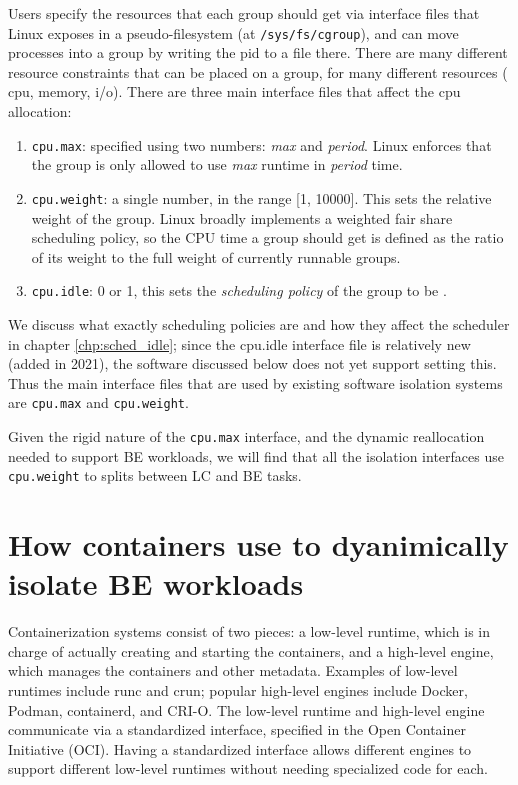 Users specify the resources that each group should get via interface files that
Linux exposes in a pseudo-filesystem (at \texttt{/sys/fs/cgroup}), and can move
processes into a group by writing the pid to a file there. There are many
different resource constraints that can be placed on a group, for many different
resources (\eg{} cpu, memory, i/o). There are three main interface files that
affect the cpu allocation:
\begin{enumerate}
    \item \texttt{cpu.max}: specified using two numbers: \textit{max} and \textit{period}. Linux
    enforces that the group is only allowed to use \textit{max} runtime in \textit{period} time.
    \item \texttt{cpu.weight}: a single number, in the range [1, 10000]. This
    sets the relative weight of the group. Linux broadly implements a weighted fair
    share scheduling policy, so the CPU time a group should get is defined as
    the ratio of its weight to the full weight of currently runnable groups.
    \item \texttt{cpu.idle}: 0 or 1, this sets the \textit{scheduling policy} of
    the group to be \schedidle{}.
\end{enumerate}

We discuss what exactly scheduling policies are and how they affect the
scheduler in chapter \ref{chp:sched_idle}; since the cpu.idle \cgroups{}
interface file is relatively new (added in 2021), the software discussed below
does not yet support setting this. Thus the main interface files that are used
by existing software isolation systems are \texttt{cpu.max} and
\texttt{cpu.weight}.

Given the rigid nature of the \texttt{cpu.max} interface, and the dynamic
reallocation needed to support BE workloads, we will find that all the isolation
interfaces use \texttt{cpu.weight} to splits between LC and BE tasks.

\section{How containers use \cgroups{} to dyanimically isolate BE workloads}

Containerization systems consist of two pieces: a low-level runtime, which is in
charge of actually creating and starting the containers, and a high-level
engine, which manages the containers and other metadata. Examples of low-level
runtimes include runc and crun; popular high-level engines include Docker,
Podman, containerd, and CRI-O. The low-level runtime and high-level engine
communicate via a standardized interface, specified in the Open Container
Initiative (OCI). Having a standardized interface allows different engines to
support different low-level runtimes without needing specialized code for each.

